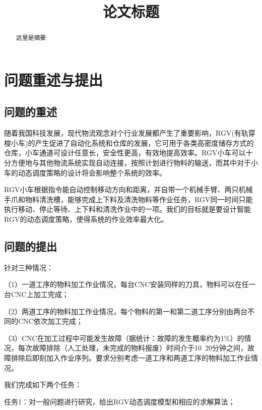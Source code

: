 \documentclass[withoutpreface,bwprint]{cumcmthesis} %
\title{论文标题}
\begin{document}
 \maketitle
 \begin{abstract}

这里是摘要

\end{abstract}

\tableofcontents

\section{问题重述与提出}

\subsection{问题的重述}

随着我国科技发展，现代物流观念对个行业发展都产生了重要影响，RGV(有轨穿梭小车)的产生促进了自动化系统和仓库的发展，它可用于各类高密度储存方式的仓库，小车通道可设计任意长，安全性更高，有效地提高效率。RGV小车可以十分方便地与其他物流系统实现自动连接，按照计划进行物料的输送，而其中对于小车的动态调度策略的设计将会影响整个系统的效率。

RGV小车根据指令能自动控制移动方向和距离，并自带一个机械手臂、两只机械手爪和物料清洗槽，能够完成上下料及清洗物料等作业任务，RGV同一时间只能执行移动、停止等待、上下料和清洗作业中的一项。我们的目标就是要设计智能RGV的动态调度策略，使得系统的作业效率最大化。


\subsection{问题的提出}

针对三种情况：

（1）一道工序的物料加工作业情况，每台CNC安装同样的刀具，物料可以在任一台CNC上加工完成；

（2）两道工序的物料加工作业情况，每个物料的第一和第二道工序分别由两台不同的CNC依次加工完成；

（3）CNC在加工过程中可能发生故障（据统计：故障的发生概率约为1\%）的情况，每次故障排除（人工处理，未完成的物料报废）时间介于10~20分钟之间，故障排除后即刻加入作业序列。要求分别考虑一道工序和两道工序的物料加工作业情况。

我们完成如下两个任务：

任务1：对一般问题进行研究，给出RGV动态调度模型和相应的求解算法；
\end{document}

